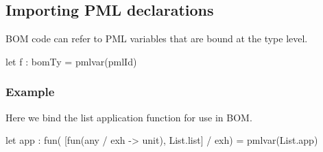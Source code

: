 \documentclass[11pt]{article}
\begin{document}
\subsection{Importing PML declarations}
BOM code can refer to PML variables that are bound at the type level.
\begin{centercode}
  let f : bomTy = pmlvar(pmlId)
\end{centercode}

\subsubsection{Example}
Here we bind the list application function for use in BOM.
\begin{centercode}
  let app : fun( [fun(any / exh -> unit), List.list] / exh) = 
                     pmlvar(List.app)
\end{centercode}



\end{document}
